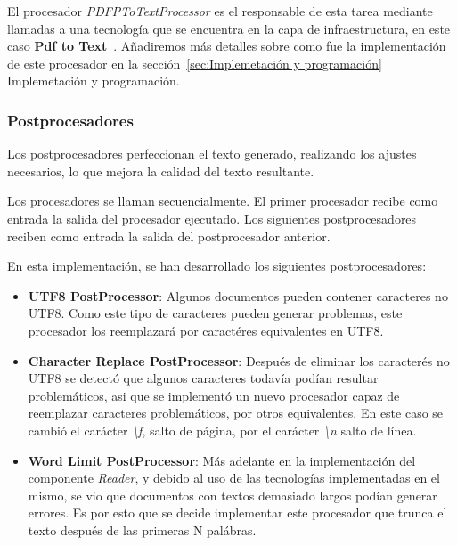 El procesador \textit{PDFPToTextProcessor} es el responsable de esta tarea mediante llamadas a una tecnología que se
encuentra en la capa de infraestructura, en este caso
\textbf{Pdf to Text}~\cite{https://www.xpdfreader.com/pdftotext-man.html}.
Añadiremos más detalles sobre como fue la implementación de este procesador en la
sección~\ref{sec:Implemetación y programación} Implemetación y programación.

\subsubsection*{Postprocesadores}

Los postprocesadores perfeccionan el texto generado, realizando los ajustes necesarios, lo que mejora la calidad del
texto resultante.

Los procesadores se llaman secuencialmente.
El primer procesador recibe como entrada la salida del procesador ejecutado.
Los siguientes postprocesadores reciben como entrada la salida del postprocesador anterior.

En esta implementación, se han desarrollado los siguientes postprocesadores:

\begin{itemize}
    \item \textbf{UTF8 PostProcessor}: Algunos documentos pueden contener caracteres no UTF8. Como este tipo de
    caracteres pueden generar problemas, este procesador los reemplazará por caractéres equivalentes en UTF8.

    \item \textbf{Character Replace PostProcessor}: Después de eliminar los caracterés no UTF8 se detectó que algunos
    caracteres todavía podían resultar problemáticos, asi que se implementó un nuevo procesador capaz de reemplazar
    caracteres problemáticos, por otros equivalentes.
    En este caso se cambió el carácter \textit{\textbackslash f}, salto de página, por el carácter
    \textit{\textbackslash n} salto de línea.

    \item \textbf{Word Limit PostProcessor}: Más adelante en la implementación del componente \textit{Reader}, y debido
    al uso de las tecnologías implementadas en el mismo, se vio que documentos con textos demasiado largos podían
    generar errores.
    Es por esto que se decide implementar este procesador que trunca el texto después de las primeras N palábras.
\end{itemize}

